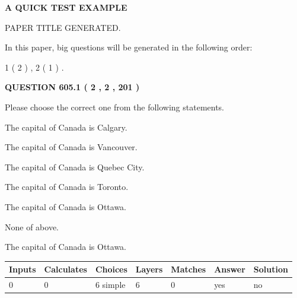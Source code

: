 \documentclass[12pt]{article}
\begin{document}
   
\vspace{0.2in}
   
   
   
   
   
   
   
   
 \vspace{0.2in}
{\LARGE {\textbf{ A QUICK TEST EXAMPLE}}}
   
   
 PAPER TITLE GENERATED.
   
   
   
\vspace{0.2in}
   
In this paper, big questions will be generated in the following order: 
   
   
   1 ( 2 )
 ,
   2 ( 1 )
 .
  
\vspace{0.2in}
  
{\textbf{\Large{QUESTION
605.1 
 ( 2 , 2 , 201 )
}}}
  
  
Please choose the correct one from the following statements.
 
 
The capital of Canada is Calgary.
 
 
The capital of Canada is Vancouver.
 
 
The capital of Canada is Quebec City.
 
 
The capital of Canada is Toronto.
 
 
The capital of Canada is Ottawa.
 
 
 None of above.
 
 
\noindent{}
 
 
The capital of Canada is Ottawa.
 
 
\noindent{}
 
 
   
   
   
   
\noindent\begin{tabular}{|l|l|l|l|l|l|l|}
 \hline
Inputs & Calculates & Choices & Layers & Matches & Answer & Solution \\ \hline
 0  & 
 0  & 
 6
  simple  
  & 
 6  & 
 0  & 
  yes & 
  no 
  \\ \hline
 \end{tabular}
   
\end{document}

